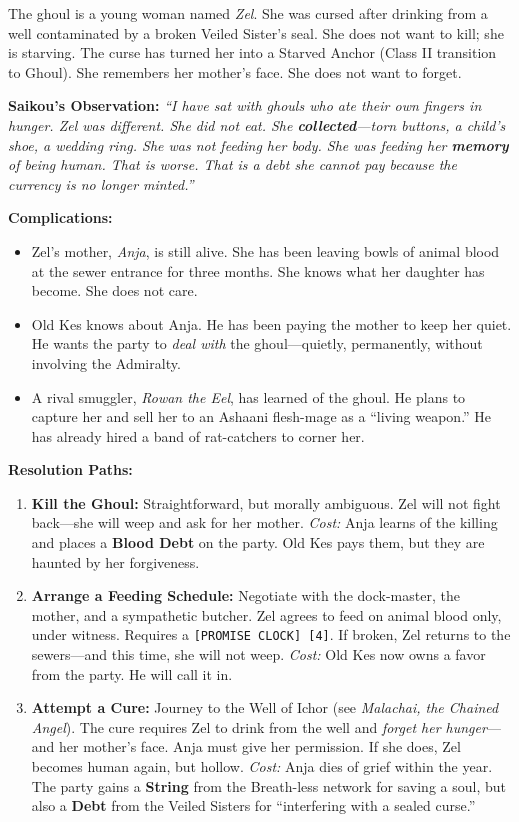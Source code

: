 The ghoul is a young woman named \emph{Zel}. She was cursed after drinking from a well contaminated by a broken Veiled Sister's seal. She does not want to kill; she is starving. The curse has turned her into a Starved Anchor (Class II transition to Ghoul). She remembers her mother's face. She does not want to forget.

\textbf{Saikou's Observation:} \emph{``I have sat with ghouls who ate their own fingers in hunger. Zel was different. She did not eat. She \textbf{collected}---torn buttons, a child's shoe, a wedding ring. She was not feeding her body. She was feeding her \textbf{memory} of being human. That is worse. That is a debt she cannot pay because the currency is no longer minted.''}

\textbf{Complications:}
\begin{itemize}
  \item Zel's mother, \emph{Anja}, is still alive. She has been leaving bowls of animal blood at the sewer entrance for three months. She knows what her daughter has become. She does not care.
  \item Old Kes knows about Anja. He has been paying the mother to keep her quiet. He wants the party to \emph{deal with} the ghoul---quietly, permanently, without involving the Admiralty.
  \item A rival smuggler, \emph{Rowan the Eel}, has learned of the ghoul. He plans to capture her and sell her to an Ashaani flesh-mage as a ``living weapon.'' He has already hired a band of rat-catchers to corner her.
\end{itemize}

\textbf{Resolution Paths:}
\begin{enumerate}
  \item \textbf{Kill the Ghoul:} Straightforward, but morally ambiguous. Zel will not fight back---she will weep and ask for her mother. \textit{Cost:} Anja learns of the killing and places a \textbf{Blood Debt} on the party. Old Kes pays them, but they are haunted by her forgiveness.
  \item \textbf{Arrange a Feeding Schedule:} Negotiate with the dock-master, the mother, and a sympathetic butcher. Zel agrees to feed on animal blood only, under witness. Requires a \texttt{[PROMISE CLOCK] [4]}. If broken, Zel returns to the sewers---and this time, she will not weep. \textit{Cost:} Old Kes now owns a favor from the party. He will call it in.
  \item \textbf{Attempt a Cure:} Journey to the Well of Ichor (see \emph{Malachai, the Chained Angel}). The cure requires Zel to drink from the well and \emph{forget her hunger}---and her mother's face. Anja must give her permission. If she does, Zel becomes human again, but hollow. \textit{Cost:} Anja dies of grief within the year. The party gains a \textbf{String} from the Breath-less network for saving a soul, but also a \textbf{Debt} from the Veiled Sisters for ``interfering with a sealed curse.''
\end{enumerate}

